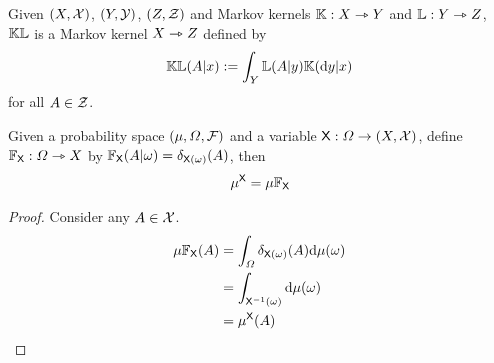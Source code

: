 \begin{definition}
Given $(X,\mathcal{X})$, $(Y,\mathcal{Y})$, $(Z,\mathcal{Z})$ and Markov kernels $\mathbb{K}:X\rightarrowtriangle Y$ and $\mathbb{L}:Y\rightarrowtriangle Z$, $\mathbb{K}\mathbb{L}$ is a Markov kernel $X\rightarrowtriangle Z$ defined by
\begin{align}
	\mathbb{K}\mathbb{L}(A|x):= \int_{Y} \mathbb{L}(A|y)\mathbb{K}(\mathrm{d}y|x)
\end{align}
for all $A\in \mathcal{Z}$.
\end{definition}

\begin{lemma}\label{lem:pushf_kprod}
Given a probability space $(\mu,\Omega,\mathcal{F})$ and a variable $\mathsf{X}:\Omega\to (X,\mathcal{X})$, define $\mathbb{F}_{\mathsf{X}}:\Omega\rightarrowtriangle X$ by $\mathbb{F}_{\mathsf{X}}(A|\omega)=\delta_{\mathsf{X}(\omega)}(A)$, then
\begin{align}
	\mu^{\mathsf{X}} = \mu\mathbb{F}_{\mathsf{X}}
\end{align}
\end{lemma}

\begin{proof}
Consider any $A\in \mathcal{X}$.
\begin{align}
	\mu \mathbb{F}_{\mathsf{X}}(A) &= \int_\Omega \delta_{\mathsf{X}(\omega)}(A) \mathrm{d}\mu(\omega)\\
	&= \int_{\mathsf{X}^{-1}(\omega)} \mathrm{d}\mu(\omega)\\
	&= \mu^{\mathsf{X}}(A)
\end{align}
\end{proof}




